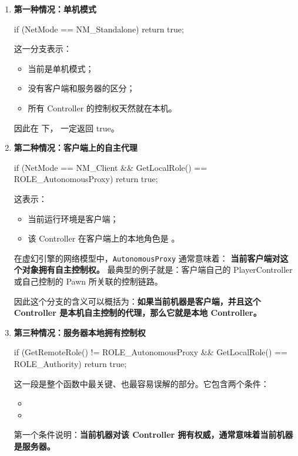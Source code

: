 \begin{enumerate}
	\item \textbf{第一种情况：单机模式}
	
	\begin{code}
		if (NetMode == NM_Standalone)
		{
			return true;
		}
	\end{code}
	
	这一分支表示：
	
	\begin{itemize}
		\item 当前是单机模式；
		\item 没有客户端和服务器的区分；
		\item 所有 Controller 的控制权天然就在本机。
	\end{itemize}
	因此在  下， 一定返回 true。
	
	\item \textbf{第二种情况：客户端上的自主代理}
	\begin{code}
		if (NetMode == NM_Client && GetLocalRole() == ROLE_AutonomousProxy)
		{
			return true;
		}
	\end{code}
	这表示：
	\begin{itemize}
		\item 当前运行环境是客户端；
		\item 该 Controller 在客户端上的本地角色是 。
	\end{itemize}
	
	在虚幻引擎的网络模型中，\texttt{AutonomousProxy} 通常意味着：	\textbf{当前客户端对这个对象拥有自主控制权。}
	最典型的例子就是：客户端自己的 PlayerController 或自己控制的 Pawn 所关联的控制链路。
	
	因此这个分支的含义可以概括为：\textbf{如果当前机器是客户端，并且这个 Controller 是本机自主控制的代理，那么它就是本地 Controller。}
	
	\item \textbf{第三种情况：服务器本地拥有控制权}
	
	\begin{code}
		if (GetRemoteRole() != ROLE_AutonomousProxy && GetLocalRole() == ROLE_Authority)
		{
			return true;
		}
	\end{code}
	这一段是整个函数中最关键、也最容易误解的部分。它包含两个条件：
	\begin{itemize}
		\item {}
		\item {}
	\end{itemize}
	第一个条件说明：\textbf{当前机器对该 Controller 拥有权威，通常意味着当前机器是服务器。}
	

\end{enumerate}
